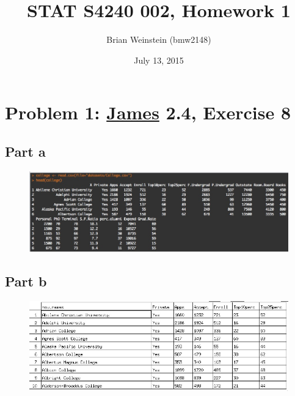 \documentclass[11pt]{article}
\begin{document}
 \thispagestyle{empty}


\title{STAT S4240 002, Homework 1}
\author{Brian Weinstein (bmw2148)}
\date{July 13, 2015}
\maketitle


\section*{Problem 1: \href{http://www-bcf.usc.edu/~gareth/ISL/}{James} 2.4, Exercise 8}

\subsection*{Part a}

\begin{figure}[H]
	\centering
	\includegraphics[width=6.5in]{8a.jpeg}
\end{figure}


\subsection*{Part b}

\begin{figure}[H]
	\centering
	\includegraphics[width=6.5in]{8b.jpeg}
\end{figure}
\end{document}
